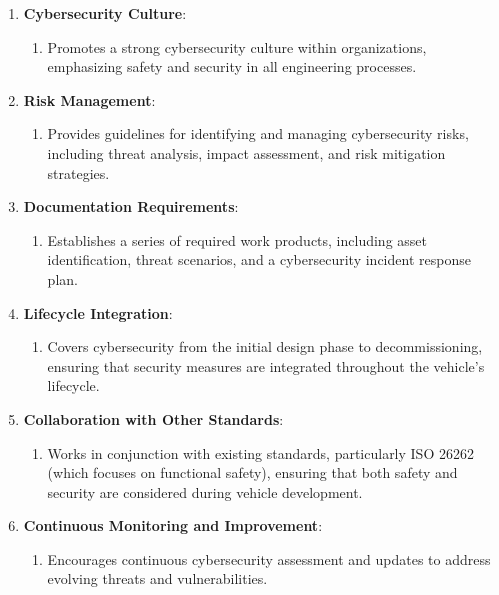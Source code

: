 \begin{enumerate}
    \item \textbf{Cybersecurity Culture}:
    \begin{enumerate}
        \item Promotes a strong cybersecurity culture within organizations, emphasizing safety and security in all engineering processes.
    \end{enumerate}

    \item \textbf{Risk Management}:
    \begin{enumerate}
        \item Provides guidelines for identifying and managing cybersecurity risks, including threat analysis, impact assessment, and risk mitigation strategies.
    \end{enumerate}

    \item \textbf{Documentation Requirements}:
    \begin{enumerate}
        \item Establishes a series of required work products, including asset identification, threat scenarios, and a cybersecurity incident response plan.
    \end{enumerate}

    \item \textbf{Lifecycle Integration}:
    \begin{enumerate}
        \item Covers cybersecurity from the initial design phase to decommissioning, ensuring that security measures are integrated throughout the vehicle's lifecycle.
    \end{enumerate}

    \item \textbf{Collaboration with Other Standards}:
    \begin{enumerate}
        \item Works in conjunction with existing standards, particularly ISO 26262 (which focuses on functional safety), ensuring that both safety and security are considered during vehicle development.
    \end{enumerate}

    \item \textbf{Continuous Monitoring and Improvement}:
    \begin{enumerate}
        \item Encourages continuous cybersecurity assessment and updates to address evolving threats and vulnerabilities.
    \end{enumerate}
\end{enumerate}

